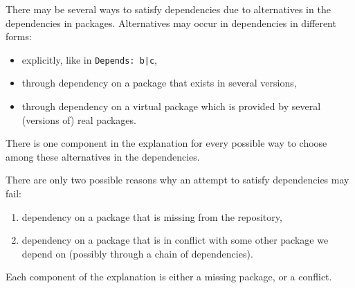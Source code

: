 There may be several ways to satisfy dependencies due to alternatives
in the dependencies in packages. Alternatives may occur in dependencies
in different forms:
\begin{itemize}
\item explicitly, like in \texttt{Depends: b|c},
\item through dependency on a package that exists in several versions,
\item through dependency on a virtual package which is provided by several
  (versions of) real packages.
\end{itemize}
There is one component in the explanation for every possible way to
choose among these alternatives in the dependencies.

There are only two possible reasons why an attempt to satisfy dependencies
may fail:
\begin{enumerate}
\item dependency on a package that is missing from the repository,
\item dependency on a package that is in conflict with some other package
  we depend on (possibly through a chain of dependencies).
\end{enumerate}
Each component of the explanation is either a missing package, or a conflict. 

